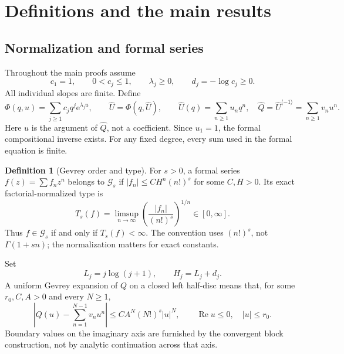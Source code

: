 \documentclass[11pt,a4paper]{article}
\numberwithin{equation}{section}
\theoremstyle{definition}
\newtheorem{definition}[theorem]{Definition}
\theoremstyle{remark}
\theoremstyle{definition}
\newcommand{\U}{\widehat U}
\newcommand{\Q}{\widehat Q}
\newcommand{\Gev}{\mathcal G}
\newcommand{\e}{\mathrm e}
\newcommand{\Ree}{\operatorname{Re}}
\newcommand{\inv}{\langle-1\rangle}
\begin{document}
\section{Definitions and the main results}
\label{sec:main}

\subsection{Normalization and formal series}
Throughout the main proofs assume
\begin{equation}
 c_1=1,\qquad 0<c_j\le1,\qquad \lambda_j\ge0,\qquad
 d_j=-\log c_j\ge0.
 \label{eq:normalization}
\end{equation}
All individual slopes are finite. Define
\begin{equation}
 \Phi(q,u)=\sum_{j\ge1}c_jq^j\e^{\lambda_j u},\qquad
 \U=\Phi(q,\U),\qquad
 \U(q)=\sum_{n\ge1}u_nq^n,
 \quad \Q=\U^{\inv}=\sum_{n\ge1}v_nu^n.
 \label{eq:model}
\end{equation}
Here $u$ is the argument of $\Q$, not a coefficient. Since $u_1=1$, the
formal compositional inverse exists. For any fixed degree, every sum
used in the formal equation is finite.

\begin{definition}[Gevrey order and type]
For $s>0$, a formal series $f(z)=\sum f_nz^n$ belongs to $\Gev_s$ if
$|f_n|\le CH^n(n!)^s$ for some $C,H>0$. Its exact
factorial-normalized type is
\begin{equation}
 T_s(f)=\limsup_{n\to\infty}
                  \left(\frac{|f_n|}{(n!)^s}\right)^{1/n}
                  \in[0,\infty].
 \label{eq:type}
\end{equation}
Thus $f\in\Gev_s$ if and only if $T_s(f)<\infty$. The convention uses
$(n!)^s$, not $\Gamma(1+sn)$; the normalization matters for exact constants.
\end{definition}

Set
\begin{equation}
 L_j=j\log(j+1),\qquad H_j=L_j+d_j.
 \label{eq:Hj}
\end{equation}
A uniform Gevrey expansion of $Q$ on a closed left half-disc means that,
for some $r_0,C,A>0$ and every $N\ge1$,
\begin{equation}
 \left|Q(u)-\sum_{n=1}^{N-1}v_nu^n\right|
 \le CA^N(N!)^s|u|^N,
 \qquad \Ree u\le0,\quad |u|\le r_0.
 \label{eq:uniform-G}
\end{equation}
Boundary values on the imaginary axis are furnished by the convergent
block construction, not by analytic continuation across that axis.
\end{document}
